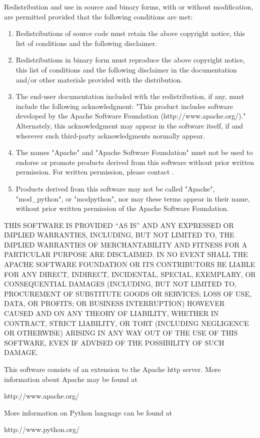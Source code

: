 \centerline{}

Redistribution and use in source and binary forms, with or without
modification, are permitted provided that the following conditions
are met:

\begin{enumerate}

\item
Redistributions of source code must retain the above copyright
notice, this list of conditions and the following disclaimer. 

\item
Redistributions in binary form must reproduce the above copyright
notice, this list of conditions and the following disclaimer in the
documentation and/or other materials provided with the distribution.

\item
The end-user documentation included with the redistribution, if any,
must include the following acknowledgment: "This product includes
software developed by the Apache Software Foundation
(http://www.apache.org/)."  Alternately, this acknowledgment may
appear in the software itself, if and wherever such third-party
acknowledgments normally appear.

\item
The names "Apache" and "Apache Software Foundation" must not be used
to endorse or promote products derived from this software without
prior written permission. For written permission, please contact
.

\item
Products derived from this software may not be called "Apache",
"mod_python", or "modpython", nor may these terms appear in their
name, without prior written permission of the Apache Software
Foundation.

\end{enumerate}

THIS SOFTWARE IS PROVIDED ``AS IS'' AND ANY EXPRESSED OR IMPLIED
WARRANTIES, INCLUDING, BUT NOT LIMITED TO, THE IMPLIED WARRANTIES OF
MERCHANTABILITY AND FITNESS FOR A PARTICULAR PURPOSE ARE DISCLAIMED.
IN NO EVENT SHALL THE APACHE SOFTWARE FOUNDATION OR ITS CONTRIBUTORS
BE LIABLE FOR ANY DIRECT, INDIRECT, INCIDENTAL, SPECIAL, EXEMPLARY, OR
CONSEQUENTIAL DAMAGES (INCLUDING, BUT NOT LIMITED TO, PROCUREMENT OF
SUBSTITUTE GOODS OR SERVICES; LOSS OF USE, DATA, OR PROFITS; OR
BUSINESS INTERRUPTION) HOWEVER CAUSED AND ON ANY THEORY OF LIABILITY,
WHETHER IN CONTRACT, STRICT LIABILITY, OR TORT (INCLUDING NEGLIGENCE
OR OTHERWISE) ARISING IN ANY WAY OUT OF THE USE OF THIS SOFTWARE, EVEN
IF ADVISED OF THE POSSIBILITY OF SUCH DAMAGE.


This software consists of an extension to the Apache http server.
More information about Apache may be found at

http://www.apache.org/

More information on Python language can be found at

http://www.python.org/

